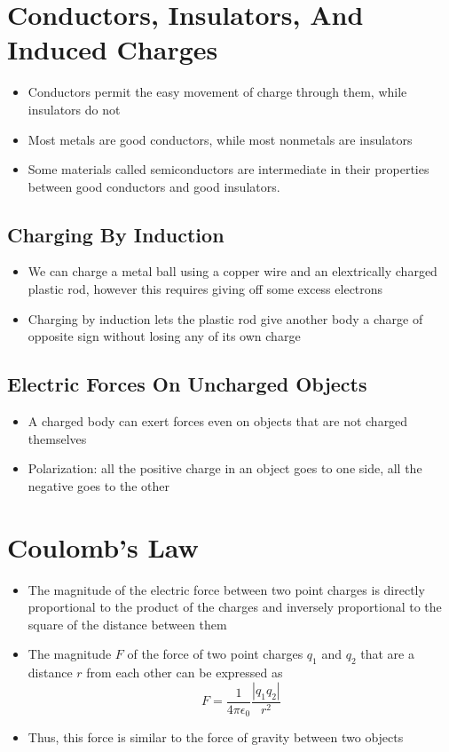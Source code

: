 \documentclass[11pt, a4paper]{article}
\begin{document}
\section[21.2, Conductors, Insulators, And Induced Charges]{Conductors, Insulators, And
    Induced Charges}
\begin{itemize}
    \item Conductors permit the easy movement of charge through them, while insulators do
        not
    \item Most metals are good conductors, while most nonmetals are insulators
    \item Some materials called semiconductors are intermediate in their properties
        between good conductors and good insulators.
\end{itemize}
\subsection{Charging By Induction}
\begin{itemize}
    \item We can charge a metal ball using a copper wire and an elextrically charged
        plastic rod, however this requires giving off some excess electrons
    \item Charging by induction lets the plastic rod give another body a charge of
        opposite sign without losing any of its own charge
\end{itemize}
\subsection{Electric Forces On Uncharged Objects}
\begin{itemize}
    \item  A charged body can exert forces even on objects that are not charged themselves
    \item Polarization: all the positive charge in an object goes to one side, all the
        negative goes to the other
\end{itemize}
\section[21.3, Coulomb's Law]{Coulomb's Law}
\begin{itemize}
    \item The magnitude of the electric force between two point charges is directly
        proportional to the product of the charges and inversely proportional to the
        square of the distance between them
    \item The magnitude $F$ of the force of two point charges $q_1$ and $q_2$ that are a
        distance $r$ from each other can be expressed as
        \begin{equation}
            F = \frac{1}{4\pi\epsilon_0}\frac{|q_1 q_2|}{r^2}
        \end{equation}
    \item Thus, this force is similar to the force of gravity between two objects
\end{itemize}
\end{document}
